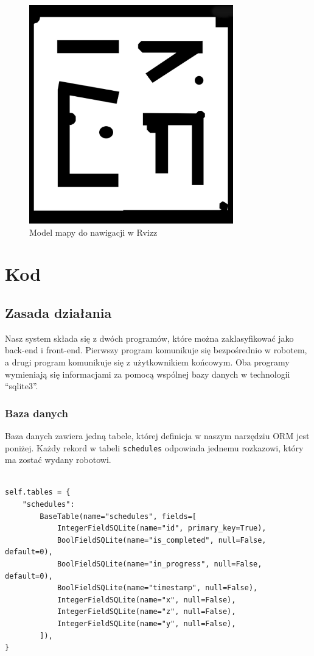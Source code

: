 \documentclass[12pt]{article}
\newcommand{\vsp}{\vspace{0.5cm}}
\begin{document}
\begin{figure}[!htb]
    \centering
    \includegraphics[height=9.5cm]{./images/rviz.png}
    \caption{Model mapy do nawigacji w Rvizz}
\end{figure}



\clearpage\newpage
\section{Kod}

\subsection{Zasada działania}

\vsp 
Nasz system składa się z dwóch programów, które można zaklasyfikować jako back-end i front-end. Pierwszy program komunikuje się bezpośrednio w robotem, a drugi program komunikuje się z użytkownikiem końcowym. Oba programy wymieniają się informacjami za pomocą wspólnej bazy danych w technologii ``sqlite3''. 

\vsp
\subsubsection*{Baza danych}

\noindent Baza danych zawiera jedną tabele, której definicja w naszym narzędziu ORM jest poniżej. Każdy rekord w tabeli \texttt{schedules} odpowiada jednemu rozkazowi, który ma zostać wydany robotowi.

\vsp\vsp

\begin{lstlisting}

self.tables = {
    "schedules":
        BaseTable(name="schedules", fields=[
            IntegerFieldSQLite(name="id", primary_key=True),
            BoolFieldSQLite(name="is_completed", null=False, default=0),
            BoolFieldSQLite(name="in_progress", null=False, default=0),
            BoolFieldSQLite(name="timestamp", null=False),
            IntegerFieldSQLite(name="x", null=False),
            IntegerFieldSQLite(name="z", null=False),
            IntegerFieldSQLite(name="y", null=False),
        ]),
}

\end{lstlisting}
\end{document}
